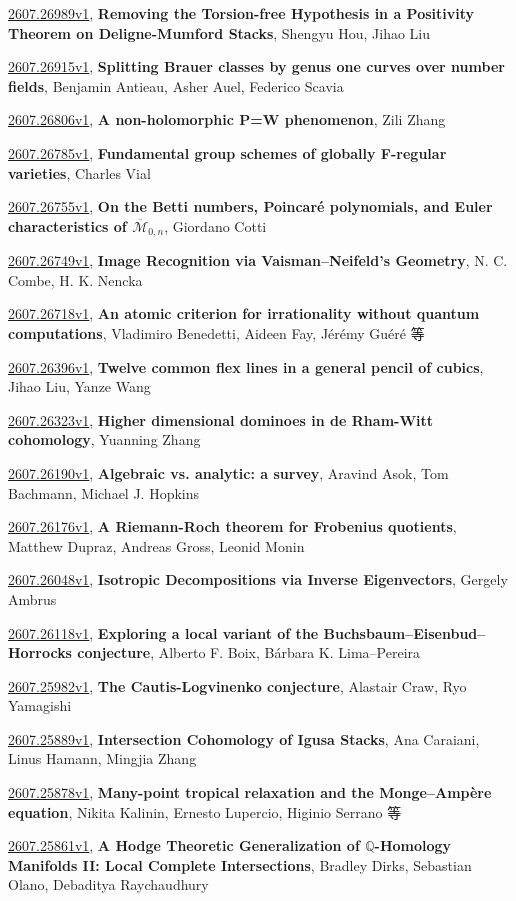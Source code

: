 \documentclass[9pt, a4paper]{article}
\theoremstyle{plain}
\theoremstyle{definition}
\theoremstyle{remark}
\newcommand{\arxiv}[3]{\href{https://arxiv.org/abs/#1}{#1}, \textbf{\textcolor{arxivblue}{#2}}, #3}
\begin{document}
\arxiv{2607.26989v1}{Removing the Torsion-free Hypothesis in a Positivity Theorem on Deligne-Mumford Stacks}{Shengyu Hou, Jihao Liu}

\arxiv{2607.26915v1}{Splitting Brauer classes by genus one curves over number fields}{Benjamin Antieau, Asher Auel, Federico Scavia}

\arxiv{2607.26806v1}{A non-holomorphic P=W phenomenon}{Zili Zhang}

\arxiv{2607.26785v1}{Fundamental group schemes of globally F-regular varieties}{Charles Vial}

\arxiv{2607.26755v1}{On the Betti numbers, Poincaré polynomials, and Euler characteristics of $\overline{\mathcal M}_{0,n}$}{Giordano Cotti}

\arxiv{2607.26749v1}{Image Recognition via Vaisman--Neifeld's Geometry}{N. C. Combe, H. K. Nencka}

\arxiv{2607.26718v1}{An atomic criterion for irrationality without quantum computations}{Vladimiro Benedetti, Aideen Fay, Jérémy Guéré 等}

\arxiv{2607.26396v1}{Twelve common flex lines in a general pencil of cubics}{Jihao Liu, Yanze Wang}

\arxiv{2607.26323v1}{Higher dimensional dominoes in de Rham-Witt cohomology}{Yuanning Zhang}

\arxiv{2607.26190v1}{Algebraic vs. analytic: a survey}{Aravind Asok, Tom Bachmann, Michael J. Hopkins}

\arxiv{2607.26176v1}{A Riemann-Roch theorem for Frobenius quotients}{Matthew Dupraz, Andreas Gross, Leonid Monin}

\arxiv{2607.26048v1}{Isotropic Decompositions via Inverse Eigenvectors}{Gergely Ambrus}

\arxiv{2607.26118v1}{Exploring a local variant of the Buchsbaum--Eisenbud--Horrocks conjecture}{Alberto F. Boix, Bárbara K. Lima--Pereira}

\arxiv{2607.25982v1}{The Cautis-Logvinenko conjecture}{Alastair Craw, Ryo Yamagishi}

\arxiv{2607.25889v1}{Intersection Cohomology of Igusa Stacks}{Ana Caraiani, Linus Hamann, Mingjia Zhang}

\arxiv{2607.25878v1}{Many-point tropical relaxation and the Monge--Ampère equation}{Nikita Kalinin, Ernesto Lupercio, Higinio Serrano 等}

\arxiv{2607.25861v1}{A Hodge Theoretic Generalization of $\mathbb{Q}$-Homology Manifolds II: Local Complete Intersections}{Bradley Dirks, Sebastian Olano, Debaditya Raychaudhury}
\end{document}
